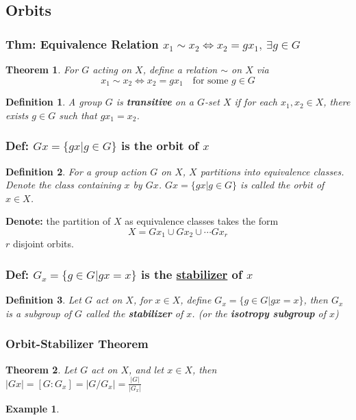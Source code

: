 \documentclass[11pt,a4paper]{article}
\newtheorem{theorem}{Theorem}
\newtheorem{example}{Example}
\newtheorem{definition}{Definition}
\begin{document}
\subsection{Orbits}
\subsubsection{Thm: Equivalence Relation $x_1\sim x_2 \Leftrightarrow x_2=gx_1,\ \exists g\in G$}
\begin{theorem}
    For $G$ acting on $X$, define a relation $\sim$ on $X$ via $$x_1\sim x_2\Leftrightarrow x_2=gx_1\quad \text{for some }g\in G$$
\end{theorem}

\begin{definition}
    A group $G$ is \textbf{transitive} on
    a $G$-set $X$ if for each $x_1,x_2\in X$, there exists $g \in G$ such that $gx_1=x_2$.
\end{definition}

\subsubsection{Def: $Gx=\{gx|g\in G\}$ is the orbit of $x$}
\begin{definition}
    For a group action $G$ on $X$, $X$ partitions into equivalence classes. Denote the class containing $x$ by $Gx$. $Gx=\{gx|g\in G\}$ is called the orbit of $x\in X$.
\end{definition}
\textbf{Denote:} the partition of $X$ as equivalence classes takes the form $$X=Gx_1\cup Gx_2\cup \cdots Gx_r$$
$r$ disjoint orbits.

\subsubsection{Def: $G_x=\{g\in G|gx=x\}$ is the \underline{stabilizer} of $x$}
\begin{definition}
    Let $G$ act on $X$, for $x\in X$, define $G_x=\{g\in G|gx=x\}$, then $G_x$ is a subgroup of $G$ called the \textbf{stabilizer} of $x$. (or the \textbf{isotropy subgroup} of $x$)
\end{definition}

\subsubsection{Orbit-Stabilizer Theorem}
\begin{theorem}
    Let $G$ act on $X$, and let $x\in X$, then $|Gx|=[G:G_x]=|G/G_x|=\frac{|G|}{|G_x|}$
\end{theorem}
\begin{example}

\end{example}
\end{document}
